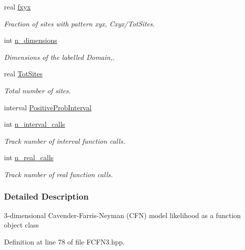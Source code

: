 \begin{DoxyCompactItemize}
real \hyperlink{classFCFN3UnRooted_ac0c6bbacb2839de940a5e1b4989444ec}{fxyx}
\begin{DoxyCompactList}\small\item\em \-Fraction of sites with pattern xyx, \-Cxyx/\-Tot\-Sites. \end{DoxyCompactList}\item 
int \hyperlink{classFCFN3UnRooted_afa33271d74b5e545e53a451ca05c803c}{n\-\_\-dimensions}
\begin{DoxyCompactList}\small\item\em \-Dimensions of the labelled \-Domain,. \end{DoxyCompactList}\item 
real \hyperlink{classFCFN3UnRooted_a4492c09788dbf6de2b0e3b37a279ed4c}{\-Tot\-Sites}
\begin{DoxyCompactList}\small\item\em \-Total number of sites. \end{DoxyCompactList}\item 
interval \hyperlink{classFCFN3UnRooted_a9afbe62a91bedfa9cde81086b4e5a0de}{\-Positive\-Prob\-Interval}
\item 
int \hyperlink{classFCFN3UnRooted_a901a8fc0d1aaf9ce8d74898a493aef25}{n\-\_\-interval\-\_\-calls}
\begin{DoxyCompactList}\small\item\em \-Track number of interval function calls. \end{DoxyCompactList}\item 
int \hyperlink{classFCFN3UnRooted_a69e7833eae34928dfa2c7506238df7ad}{n\-\_\-real\-\_\-calls}
\begin{DoxyCompactList}\small\item\em \-Track number of real function calls. \end{DoxyCompactList}\end{DoxyCompactItemize}


\subsubsection{\-Detailed \-Description}
3-\/dimensional \-Cavender-\/\-Farris-\/\-Neyman (\-C\-F\-N) model likelihood as a function object class 

\-Definition at line 78 of file \-F\-C\-F\-N3.\-hpp.



